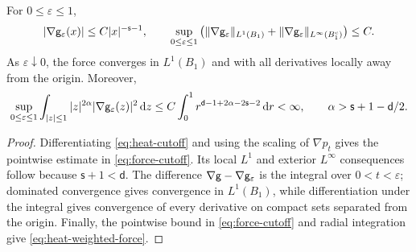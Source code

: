\documentclass[11pt,reqno]{amsart}
\numberwithin{equation}{section}
\theoremstyle{plain}
\theoremstyle{remark}
\DeclarePairedDelimiter{\norm}{\lVert}{\rVert}
\renewcommand{\d}{\mathsf{d}}\newcommand{\s}{\mathsf{s}}
\begin{document}
\begin{lemma}\label{lem:heat-force-estimates}
For $0\le\varepsilon\le1$,
\begin{equation}\label{eq:force-cutoff}
 |\nabla\g_\varepsilon(x)|\le C|x|^{-\s-1},\qquad
 \sup_{0\le\varepsilon\le1}
 \left(\norm{\nabla\g_\varepsilon}_{L^1(B_1)}
       +\norm{\nabla\g_\varepsilon}_{L^\infty(B_1^c)}\right)\le C.
\end{equation}
As $\varepsilon\downarrow0$, the force converges in $L^1(B_1)$ and with all derivatives locally away from the origin. Moreover,
\begin{equation}\label{eq:heat-weighted-force}
 \sup_{0\le\varepsilon\le1}\int_{|z|\le1}|z|^{2\alpha}
               |\nabla\g_\varepsilon(z)|^2\dd z
 \le C\int_0^1r^{\d-1+2\alpha-2\s-2}\dd r<\infty,
 \qquad\alpha>\s+1-\d/2.
\end{equation}
\end{lemma}
\begin{proof}
Differentiating \eqref{eq:heat-cutoff} and using the scaling of $\nabla p_t$ gives the pointwise estimate in \eqref{eq:force-cutoff}. Its local $L^1$ and exterior $L^\infty$ consequences follow because $\s+1<\d$. The difference $\nabla\mathsf g-\nabla\mathsf g_\varepsilon$ is the integral over $0<t<\varepsilon$; dominated convergence gives convergence in $L^1(B_1)$, while differentiation under the integral gives convergence of every derivative on compact sets separated from the origin. Finally, the pointwise bound in \eqref{eq:force-cutoff} and radial integration give \eqref{eq:heat-weighted-force}.
\end{proof}
\end{document}
